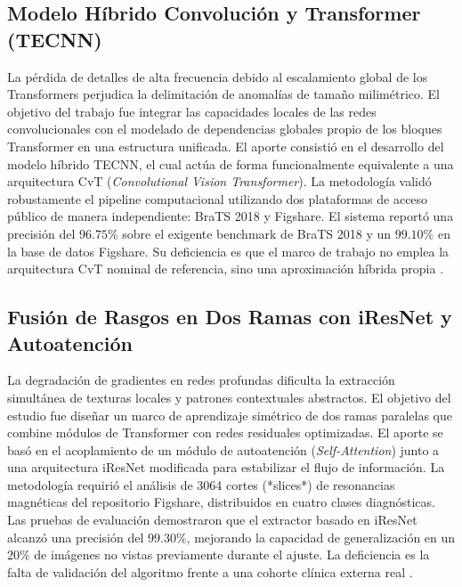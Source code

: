 \subsection{Modelo Híbrido Convolución y Transformer (TECNN)}
La pérdida de detalles de alta frecuencia debido al escalamiento global de los Transformers perjudica la delimitación de anomalías de tamaño milimétrico. El objetivo del trabajo fue integrar las capacidades locales de las redes convolucionales con el modelado de dependencias globales propio de los bloques Transformer en una estructura unificada. El aporte consistió en el desarrollo del modelo híbrido TECNN, el cual actúa de forma funcionalmente equivalente a una arquitectura CvT (\textit{Convolutional Vision Transformer}). La metodología validó robustamente el pipeline computacional utilizando dos plataformas de acceso público de manera independiente: BraTS 2018 y Figshare. El sistema reportó una precisión del $96.75\%$ sobre el exigente benchmark de BraTS 2018 y un $99.10\%$ en la base de datos Figshare. Su deficiencia es que el marco de trabajo no emplea la arquitectura CvT nominal de referencia, sino una aproximación híbrida propia \cite{Aloraini2023}.

\subsection{Fusión de Rasgos en Dos Ramas con iResNet y Autoatención}
La degradación de gradientes en redes profundas dificulta la extracción simultánea de texturas locales y patrones contextuales abstractos. El objetivo del estudio fue diseñar un marco de aprendizaje simétrico de dos ramas paralelas que combine módulos de Transformer con redes residuales optimizadas. El aporte se basó en el acoplamiento de un módulo de autoatención (\textit{Self-Attention}) junto a una arquitectura iResNet modificada para estabilizar el flujo de información. La metodología requirió el análisis de 3064 cortes (*slices*) de resonancias magnéticas del repositorio Figshare, distribuidos en cuatro clases diagnósticas. Las pruebas de evaluación demostraron que el extractor basado en iResNet alcanzó una precisión del $99.30\%$, mejorando la capacidad de generalización en un $20\%$ de imágenes no vistas previamente durante el ajuste. La deficiencia es la falta de validación del algoritmo frente a una cohorte clínica externa real \cite{Tabatabaei2023}.

